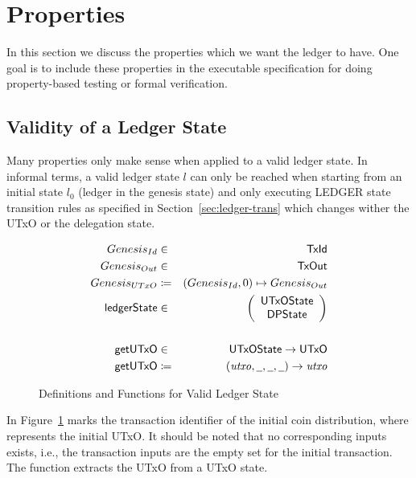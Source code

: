 \section{Properties}
\label{sec:properties}

In this section we discuss the properties which we want the ledger to have. One
goal is to include these properties in the executable specification for doing
property-based testing or formal verification.

\subsection{Validity of a Ledger State}
\label{sec:valid-ledg-state}

Many properties only make sense when applied to a valid ledger state. In
informal terms, a valid ledger state $l$ can only be reached when starting from
an initial state $l_{0}$ (ledger in the genesis state) and only executing LEDGER
state transition rules as specified in Section~\ref{sec:ledger-trans} which
changes wither the  UTxO or the delegation state.

\begin{figure}[ht]
  \centering
  \begin{align*}
    \genesisId & \in & \TxId \\
    \genesisTxOut & \in & \TxOut \\
    \genesisUTxO & \coloneqq & (\genesisId, 0) \mapsto \genesisTxOut
    \\
    \ledgerState & \in & \left(
                         \begin{array}{c}
                           \UTxOState \\
                           \DPState
                         \end{array}
    \right)\\
               && \\
    \fun{getUTxO} & \in & \UTxOState \to \UTxO \\
    \fun{getUTxO} & \coloneqq & (\var{utxo}, \wcard, \wcard, \wcard) \to \var{utxo}
  \end{align*}
  \caption{Definitions and Functions for Valid Ledger State}
  \label{fig:valid-ledger}
\end{figure}

In Figure~\ref{fig:valid-ledger} \genesisId{} marks the transaction identifier
of the initial coin distribution, where \genesisTxOut{} represents the initial
UTxO. It should be noted that no corresponding inputs exists, i.e., the
transaction inputs are the empty set for the initial transaction. The function
 extracts the UTxO from a UTxO state.

